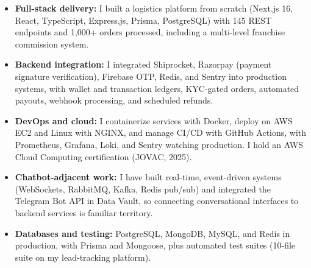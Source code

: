\documentclass[]{cover}
\begin{document}

\currentdate{\today}



{\raggedright{}\fontsize{11pt}{13pt}\selectfont
\renewcommand{\labelitemi}{\textbullet}
\renewcommand{\labelitemii}{\textbullet}
\renewcommand{\labelitemiii}{\textbullet}
\begin{itemize}
    \item \textbf{Full-stack delivery:} I built a logistics platform from scratch (Next.js 16, React, TypeScript, Express.js, Prisma, PostgreSQL) with 145 REST endpoints and 1,000+ orders processed, including a multi-level franchise commission system.
    \item \textbf{Backend integration:} I integrated Shiprocket, Razorpay (payment signature verification), Firebase OTP, Redis, and Sentry into production systems, with wallet and transaction ledgers, KYC-gated orders, automated payouts, webhook processing, and scheduled refunds.
    \item \textbf{DevOps and cloud:} I containerize services with Docker, deploy on AWS EC2 and Linux with NGINX, and manage CI/CD with GitHub Actions, with Prometheus, Grafana, Loki, and Sentry watching production. I hold an AWS Cloud Computing certification (JOVAC, 2025).
    \item \textbf{Chatbot-adjacent work:} I have built real-time, event-driven systems (WebSockets, RabbitMQ, Kafka, Redis pub/sub) and integrated the Telegram Bot API in Data Vault, so connecting conversational interfaces to backend services is familiar territory.
    \item \textbf{Databases and testing:} PostgreSQL, MongoDB, MySQL, and Redis in production, with Prisma and Mongoose, plus automated test suites (10-file suite on my lead-tracking platform).
\end{itemize}\par}
\vspace{2pt}
\end{document}
